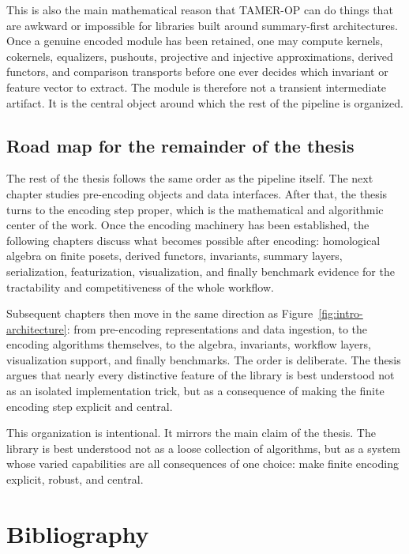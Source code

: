 \documentclass[11pt]{article}
\newcommand{\TAMER}{\textsc{TAMER-OP}}
\theoremstyle{definition}
\theoremstyle{remark}
\begin{document}
This is also the main mathematical reason that \TAMER{} can do things that are awkward or impossible for libraries built around summary-first architectures.  Once a genuine encoded module has been retained, one may compute kernels, cokernels, equalizers, pushouts, projective and injective approximations, derived functors, and comparison transports before one ever decides which invariant or feature vector to extract.  The module is therefore not a transient intermediate artifact.  It is the central object around which the rest of the pipeline is organized.

\subsection{Road map for the remainder of the thesis}

The rest of the thesis follows the same order as the pipeline itself.  The next chapter studies pre-encoding objects and data interfaces.  After that, the thesis turns to the encoding step proper, which is the mathematical and algorithmic center of the work.  Once the encoding machinery has been established, the following chapters discuss what becomes possible after encoding: homological algebra on finite posets, derived functors, invariants, summary layers, serialization, featurization, visualization, and finally benchmark evidence for the tractability and competitiveness of the whole workflow.

Subsequent chapters then move in the same direction as Figure~\ref{fig:intro-architecture}: from pre-encoding representations and data ingestion, to the encoding algorithms themselves, to the algebra, invariants, workflow layers, visualization support, and finally benchmarks. The order is deliberate. The thesis argues that nearly every distinctive feature of the library is best understood not as an isolated implementation trick, but as a consequence of making the finite encoding step explicit and central.

This organization is intentional.  It mirrors the main claim of the thesis.  The library is best understood not as a loose collection of algorithms, but as a system whose varied capabilities are all consequences of one choice: make finite encoding explicit, robust, and central.


\section{Bibliography}\label{app:bibliography-notes}
\end{document}
